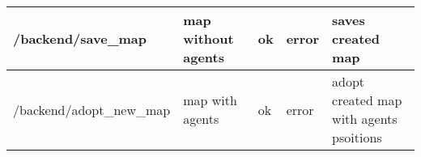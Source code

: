 \begin{landscape}
\begin{table}[]
\begin{tabular}{|l|l|l|l|l|}
/backend/save_map               & map without agents & ok                                & error                                        & saves created map                       \\ \hline
/backend/adopt_new_map          & map with agents    & ok                                & error                                        & adopt created map with agents psoitions \\ \hline
\end{tabular}
\end{table}
\end{landscape}